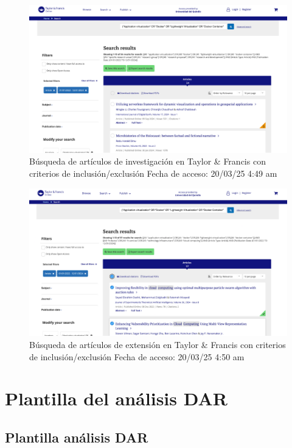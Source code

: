 \FloatBarrier\begin{figure}[htbp]
    \centering
    \includegraphics[width=\textwidth,keepaspectratio]{apendices/BD/criterios/TF-inv.png}
    \caption{Búsqueda de artículos de investigación en Taylor \& Francis con criterios de inclusión/exclusión
    Fecha de acceso: 20/03/25 4:49 am
    }\label{fig:busqueda29}
\end{figure}
\FloatBarrier\begin{figure}[htbp]
    \centering
    \includegraphics[width=\textwidth,keepaspectratio]{apendices/BD/criterios/TF-ind.png}
    \caption{Búsqueda de artículos de extensión en Taylor \& Francis con criterios de inclusión/exclusión
    Fecha de acceso: 20/03/25 4:50 am
    }\label{fig:busqueda30}
\end{figure}
\FloatBarrier\chapter*{Plantilla del análisis DAR}
\section*{Plantilla análisis DAR}

